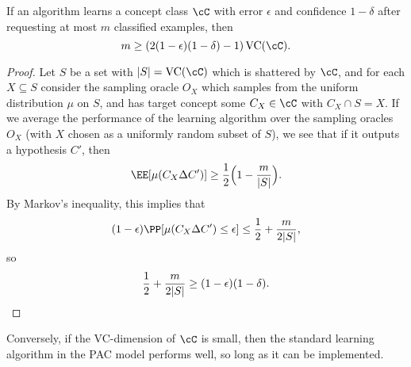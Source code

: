 \begin{prop} If an algorithm learns a concept class $\cC$ with error $\epsilon$ and confidence $1-\delta$ after requesting at most $m$ classified examples, then
\[
m \ge (2(1-\epsilon)(1-\delta) - 1)\operatorname{VC}(\cC).
\]
\end{prop}
\begin{proof} Let $S$ be a set with $|S| = \operatorname{VC}(\cC)$ which is shattered by $\cC$, and for each $X \subseteq S$ consider the sampling oracle $O_X$ which samples from the uniform distribution $\mu$ on $S$, and has target concept some $C_X \in \cC$ with $C_X \cap S = X$. If we average the performance of the learning algorithm over the sampling oracles $O_X$ (with $X$ chosen as a uniformly random subset of $S$), we see that if it outputs a hypothesis $C'$, then
\[
\EE[\mu(C_X \Delta C')] \ge \frac{1}{2}\Big(1 - \frac{m}{|S|}\Big).
\]
By Markov's inequality, this implies that
\[
(1-\epsilon)\PP[\mu(C_X\Delta C') \le \epsilon] \le \frac{1}{2} + \frac{m}{2|S|},
\]
so
\[
\frac{1}{2} + \frac{m}{2|S|} \ge (1-\epsilon)(1-\delta).\qedhere
\]
\end{proof}

Conversely, if the VC-dimension of $\cC$ is small, then the standard learning algorithm in the PAC model performs well, so long as it can be implemented.

